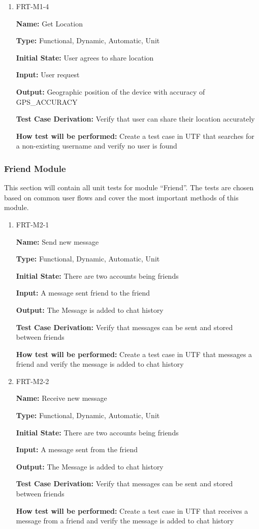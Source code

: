 \documentclass[12pt, titlepage]{article}
\begin{document}
\begin{enumerate}
\item{FRT-M1-4}

\textbf{Name:} Get Location

\textbf{Type:} Functional, Dynamic, Automatic, Unit
					
\textbf{Initial State:} User agrees to share location
					
\textbf{Input:} User request
					
\textbf{Output:} Geographic position of the device with accuracy of GPS\_ACCURACY

\textbf{Test Case Derivation:} Verify that user can share their location accurately

\textbf{How test will be performed:} Create a test case in UTF that searches for a non-existing username and verify no user is found
\end{enumerate}

\subsubsection{Friend Module}

This section will contain all unit tests for module ``Friend''. The tests are chosen based on common user flows and cover the most important methods of this module.

\begin{enumerate}
\item{FRT-M2-1}

\textbf{Name:} Send new message

\textbf{Type:} Functional, Dynamic, Automatic, Unit
					
\textbf{Initial State:} There are two accounts being friends
					
\textbf{Input:} A message sent friend to the friend
					
\textbf{Output:} The Message is added to chat history

\textbf{Test Case Derivation:} Verify that messages can be sent and stored between friends

\textbf{How test will be performed:} Create a test case in UTF that messages a friend and verify the message is added to chat history

\item{FRT-M2-2}

\textbf{Name:} Receive new message

\textbf{Type:} Functional, Dynamic, Automatic, Unit
					
\textbf{Initial State:} There are two accounts being friends
					
\textbf{Input:} A message sent from the friend
					
\textbf{Output:} The Message is added to chat history

\textbf{Test Case Derivation:} Verify that messages can be sent and stored between friends

\textbf{How test will be performed:} Create a test case in UTF that receives a message from a friend and verify the message is added to chat history
\end{enumerate}
\end{document}
